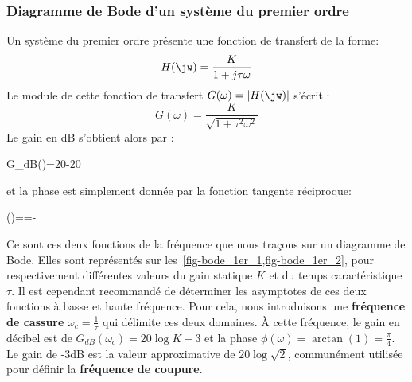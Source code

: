 \subsubsection{Diagramme de Bode d'un système du premier ordre}
Un système du premier ordre présente une fonction de transfert de la forme:
\begin{align}
H(\jw)=\dfrac{K}{1+j\tau\omega }\label{eq-1er_ftjw}
\end{align}
Le module de cette fonction de transfert $G(\omega) =|H(\jw)|$ s'écrit :
\[
    G(\omega)=\dfrac{K}{\sqrt{1+\tau^2\omega^2}}
\]
Le gain en dB s'obtient alors par :
\begin{bequation}
    G_{dB}(\omega)=20-20\label{eq-gain_1er}
\end{bequation}
et la phase est simplement donnée par la fonction tangente réciproque:
\begin{bequation}
    \phi(\omega)==-\arctan{(\tau\omega)}\label{eq-phase_1er} 
\end{bequation}
Ce sont ces deux fonctions de la fréquence que nous traçons sur un diagramme
de Bode. Elles sont représentés sur les~\cref{fig-bode_1er_1,fig-bode_1er_2}, 
pour respectivement différentes valeurs du gain statique $K$ et du temps 
caractéristique $\tau$.
\newline
Il est cependant recommandé de déterminer les asymptotes 
de ces deux fonctions à basse et haute fréquence. 
Pour cela, nous introduisons une \textbf{fréquence de cassure} 
$\omega_c=\frac{1}{\tau}$ qui délimite ces deux domaines.
\`A cette fréquence, le gain en décibel est de $G_{dB}(\omega_c)=20\log{K}-3$ 
et la phase $\phi(\omega)=\arctan{(1)}=\frac{\pi}{4}$.
Le gain de -3dB est la valeur approximative de $20\log{\sqrt{2}}$, communément
utilisée pour définir la \textbf{fréquence de coupure}.

